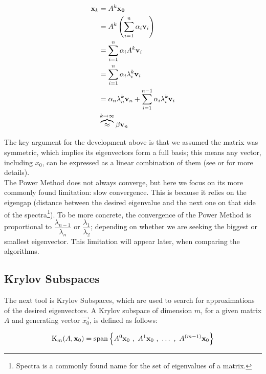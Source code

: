 \begin{align*}
  \vec{x}_k &= A^{k}\vec{x_0} \\
  &= A^{k}\left(\sum\limits_{\tiny{i=1}}^{n} \alpha_i\vec{v}_i \right) \\
  &= \sum\limits_{\tiny{i=1}}^{n} \alpha_i A^{k} \vec{v}_i  \\
  &= \sum\limits_{\tiny{i=1}}^{n} \alpha_i \lambda_i^{k} \vec{v}_i \\
  &= \alpha_n \lambda_n^{k} \vec{v}_n +
  \sum\limits_{\tiny{i=1}}^{n-1} \alpha_i \lambda_i^{k} \vec{v}_i \\
  & \overbrace{\approx}^{k \to \infty} \beta \vec{v}_n  
\end{align*}

The key argument for the development above is that we assumed the
matrix was symmetric, which implies its eigenvectors form a full
basis; this means any vector, including $x_0$, can be expressed as a
linear combination of them (see \cite{strang88} or \cite{golub13} for
more details). \\

The Power Method does not always converge, but here we focus on its
more commonly found limitation: slow convergence. This is because it
relies on the eigengap (distance between the desired eigenvalue and
the next one on that side of the spectra\footnote{Spectra is a
  commonly found name for the set of eigenvalues of a matrix.}). To be
more concrete, the convergence of the Power Method is proportional to
$\dfrac{\lambda_{n-1}}{\lambda_n}$ or $\dfrac{\lambda_1}{\lambda_2}$;
depending on whether we are seeking the  biggest or smallest
eigenvector. This limitation will appear
later, when comparing the algorithms.

\subsection{Krylov Subspaces}

The next tool is Krylov Subspaces, which are used to search for
approximations of the desired eigenvectors. A Krylov subspace of
dimension $m$, for a given matrix $A$ and generating vector
$\vec{x_0}$, is defined as follows: 

\begin{equation*}
    \Krylov{A}{\vec{x}_0}{m} =
    \func{span}
    \left\{
      A^0\vec{x}_0\ds{,} A^1\vec{x}_0\ds{,} \ldots \ds{,}  A^{(m-1)}\vec{x}_0
      \right\}  
\end{equation*}
\joinbelow{1cm}

